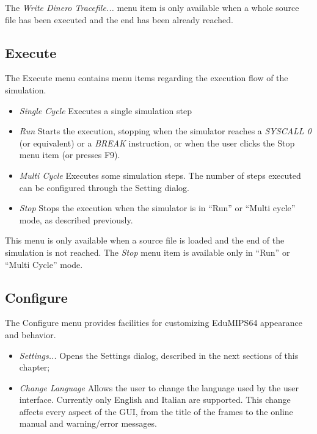 \documentclass[letterpaper,10pt,english]{sphinxmanual}
\begin{document}
The \emph{Write Dinero Tracefile...} menu item is only available when a whole
source file has been executed and the end has been already reached.


\subsection{Execute}
\label{user-interface:execute}
The Execute menu contains menu items regarding the execution flow of the
simulation.
\begin{itemize}
\item {} 
\emph{Single Cycle} Executes a single simulation step

\item {} 
\emph{Run} Starts the execution, stopping when the simulator reaches
a \emph{SYSCALL 0} (or equivalent) or a \emph{BREAK} instruction, or
when the user clicks the Stop menu item (or presses F9).

\item {} 
\emph{Multi Cycle} Executes some simulation steps. The number of
steps executed can be configured through the Setting dialog.

\end{itemize}
\begin{itemize}
\item {} 
\emph{Stop} Stops the execution when the simulator is in ``Run''
or ``Multi cycle'' mode, as described previously.

\end{itemize}

This menu is only available when a source file is loaded and the end of the
simulation is not reached. The \emph{Stop} menu item is available only in
``Run'' or ``Multi Cycle'' mode.


\subsection{Configure}
\label{user-interface:configure}
The Configure menu provides facilities for customizing EduMIPS64 appearance and
behavior.
\begin{itemize}
\item {} 
\emph{Settings...} Opens the Settings dialog, described
in the next sections of this chapter;

\item {} 
\emph{Change Language} Allows the user to change the language used
by the user interface. Currently only English and Italian are supported.
This change affects every aspect of the GUI, from the title of the frames to
the online manual and warning/error messages.

\end{itemize}
\end{document}
